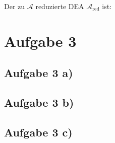 \documentclass[12pt,a4paper]{article}
\newcommand{\A}{\mathcal{A}}
\begin{document}
Der zu $\A$ reduzierte DEA $\A_{\text{red}}$ ist:

\section*{Aufgabe 3}
\subsection*{Aufgabe 3 a)}


\subsection*{Aufgabe 3 b)}


\subsection*{Aufgabe 3 c)}
\end{document}

